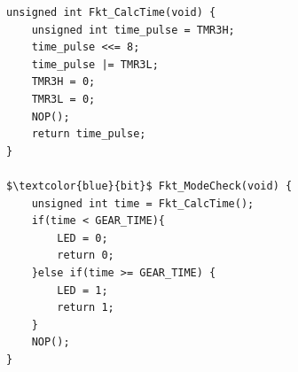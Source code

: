 \lstset{language = c}
\begin{lstlisting}
unsigned int Fkt_CalcTime(void) {
    unsigned int time_pulse = TMR3H;
    time_pulse <<= 8;
    time_pulse |= TMR3L;
    TMR3H = 0;
    TMR3L = 0;
    NOP();
    return time_pulse;
}

$\textcolor{blue}{bit}$ Fkt_ModeCheck(void) {
    unsigned int time = Fkt_CalcTime();
    if(time < GEAR_TIME){
        LED = 0;
        return 0;
    }else if(time >= GEAR_TIME) {
        LED = 1;
        return 1;
    }
    NOP();
}
\end{lstlisting}
